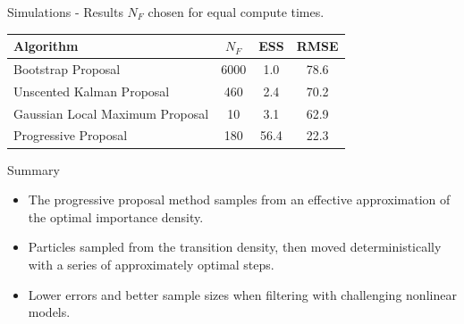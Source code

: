 \documentclass{beamer}
\begin{document}
\begin{frame}{Simulations - Results}
$N_F$ chosen for equal compute times.
\begin{table}
\centering
\begin{tabular}{l||c|c|c}
Algorithm                                & $N_F$ & ESS  & RMSE \\
\hline
Bootstrap Proposal                       &  6000 &  1.0 & 78.6 \\
Unscented Kalman Proposal                &   460 &  2.4 & 70.2 \\
Gaussian Local Maximum Proposal          &    10 &  3.1 & 62.9 \\
Progressive Proposal                     &   180 & 56.4 & 22.3 \\
\end{tabular}
\end{table}
\end{frame}

\begin{frame}{Summary}
\begin{itemize}
 \item The progressive proposal method samples from an effective approximation of the optimal importance density.
 \item Particles sampled from the transition density, then moved deterministically with a series of approximately optimal steps.
 \item Lower errors and better sample sizes when filtering with challenging nonlinear models.
\end{itemize}
\end{frame}

\begin{frame}

\end{frame}


\end{document}
